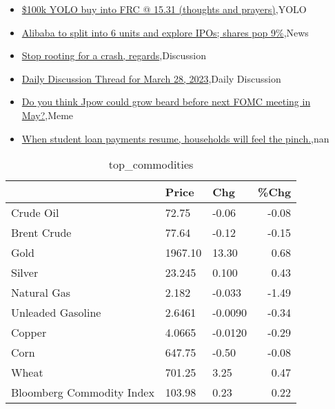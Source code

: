 \documentclass{article}%
\begin{document}
%
\begin{itemize}%
\item%
\href{https://reddit.com/r/wallstreetbets/comments/124mj3s/100k\_yolo\_buy\_into\_frc\_1531\_thoughts\_and\_prayers/}{\$100k YOLO buy into FRC @ 15.31 (thoughts and prayers)},YOLO%
\item%
\href{https://reddit.com/r/wallstreetbets/comments/124m0dz/alibaba\_to\_split\_into\_6\_units\_and\_explore\_ipos/}{Alibaba to split into 6 units and explore IPOs; shares pop 9\%},News%
\item%
\href{https://reddit.com/r/wallstreetbets/comments/124kmrd/stop\_rooting\_for\_a\_crash\_regards/}{Stop rooting for a crash, regards},Discussion%
\item%
\href{https://reddit.com/r/wallstreetbets/comments/124jrpk/daily\_discussion\_thread\_for\_march\_28\_2023/}{Daily Discussion Thread for March 28, 2023},Daily Discussion%
\item%
\href{https://reddit.com/r/wallstreetbets/comments/124hfjn/do\_you\_think\_jpow\_could\_grow\_beard\_before\_next/}{Do you think Jpow could grow beard before next FOMC meeting in May?},Meme%
\item%
\href{https://reddit.com/r/Economics/comments/124k5zb/when\_student\_loan\_payments\_resume\_households\_will/}{When student loan payments resume, households will feel the pinch.},nan%
\end{itemize}%


\begin{table}[htbp]%
\caption{top\_commodities}%
\centering%
\begin{adjustbox}{width=1\textwidth}%
\begin{tabular}{lllr}
\toprule
                          &   Price &     Chg &  \%Chg \\
\midrule
               Crude Oil  &   72.75 &   -0.06 & -0.08 \\
             Brent Crude  &   77.64 &   -0.12 & -0.15 \\
                    Gold  & 1967.10 &   13.30 &  0.68 \\
                  Silver  &  23.245 &   0.100 &  0.43 \\
             Natural Gas  &   2.182 &  -0.033 & -1.49 \\
       Unleaded Gasoline  &  2.6461 & -0.0090 & -0.34 \\
                  Copper  &  4.0665 & -0.0120 & -0.29 \\
                    Corn  &  647.75 &   -0.50 & -0.08 \\
                   Wheat  &  701.25 &    3.25 &  0.47 \\
Bloomberg Commodity Index &  103.98 &    0.23 &  0.22 \\
\bottomrule
\end{tabular}
%
\end{adjustbox}%
\end{table}
\end{document}
